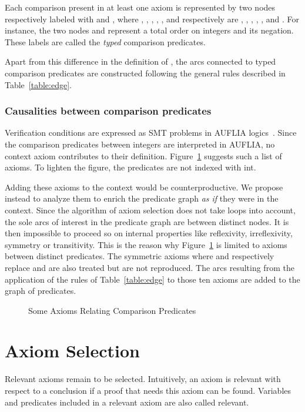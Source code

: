 \documentclass{acm_proc_article-sp}
\theoremstyle{nonumberplain}
\begin{document}
Each comparison  present in at least one axiom
is represented by two nodes respectively labeled with  and
, where , ,
, , , and
 respectively are , , , ,
, and . For instance, the two nodes 
and  represent a total order on integers and its
negation. These labels are called the \emph{typed} comparison
predicates.

Apart from this difference in the definition of ,
the arcs connected to typed comparison predicates are constructed
following the general rules described in Table~\ref{table:edge}.


\subsubsection{Causalities between comparison predicates}
Verification conditions are expressed as SMT problems in AUFLIA
logics~\cite{RanTin-SMTLIB}. Since the comparison predicates between
integers are interpreted in AUFLIA, no context axiom contributes to
their definition. Figure~\ref{comp:ax:fig} suggests such a list of
axioms. To lighten the figure, the predicates are not
indexed with \textsf{int}. 


Adding these axioms to the context would be counterproductive. We
propose instead to analyze them to enrich the predicate graph \emph{as
if} they were in the context. Since the algorithm of axiom selection
does not take loops into account, the sole arcs of interest in the
predicate graph are between distinct nodes. It is then impossible to
proceed so on internal properties like reflexivity, irreflexivity,
symmetry or transitivity. This is the reason why
Figure~\ref{comp:ax:fig} is limited to axioms between distinct
predicates. The symmetric axioms where  and  respectively
replace  and  are also treated but are not reproduced. The arcs
resulting from the application of the rules of Table~\ref{table:edge}
to those ten axioms are added to the graph of predicates.


 \begin{figure}

\caption{Some Axioms Relating Comparison Predicates
\label{comp:ax:fig}}
\end{figure}


\section{Axiom Selection}\label{sub:rel:hyp}
Relevant axioms remain to be selected. Intuitively, an axiom is
relevant with respect to a conclusion if a proof that needs this axiom
can be found. Variables and predicates included in a relevant axiom are
also called relevant.
\end{document}
